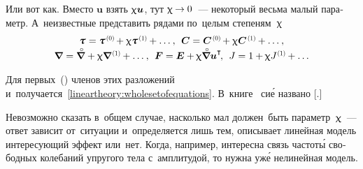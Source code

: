 \begin{otherlanguage}{russian}
Или вот как. Вместо $\bm{u}$ взять $\upchi \bm{u}$, тут ${\upchi \hspace{-0.1ex}\to 0}$~--- некоторый весьма малый параметр. А~неизвестные представить рядами по~целым степеням~$\upchi$
\vspace{.1em}\[\begin{array}{c}
\mathboldtau \hspace{.1ex} = \mathboldtau^{\hspace{0.2ex}\scalebox{0.66}[0.66]{(0)}} \hspace{-0.2ex} + \smallparameter \mathboldtau^{\hspace{0.2ex}\scalebox{0.66}[0.66]{(1)}} \hspace{-0.1ex} + \ldots \hspace{0.1ex}, \:\:
\bm{C} = \bm{C}^{\hspace{0.2ex}\scalebox{0.66}[0.66]{(0)}} \hspace{-0.2ex} + \smallparameter \bm{C}^{\hspace{0.2ex}\scalebox{0.66}[0.66]{(1)}} \hspace{-0.1ex} + \ldots \hspace{0.1ex}, \\[0.1em]
\boldnabla \hspace{0.1ex} = \boldnablacircled \hspace{0.1ex} + \smallparameter \boldnabla^{\hspace{0.2ex}\scalebox{0.66}[0.66]{(1)}} \hspace{-0.1ex} + \ldots \hspace{0.1ex} , \:\:
\bm{F} = \bm{E} + \hspace{-0.1ex} \smallparameter \boldnablacircled {\bm{u}}^{\T} \hspace{-0.3ex}, \:\:
J = 1 + \hspace{-0.1ex} \smallparameter J^{\hspace{0.1ex}\scalebox{0.66}[0.66]{(1)}} \hspace{-0.1ex} + \ldots
\end{array}\]

\noindent Для первых~() членов этих разложений и~получается~\eqref{lineartheory:wholesetofequations}. В~\hbox{книге~\cite{truesdell-firstcourse}} си\'{е} названо [.]

Невозможно сказать в~общем случае, насколько мал должен~быть параметр~$\upchi$~--- ответ зависит от~ситуации и~определяется лишь тем, описывает линейная модель интересующий эффект или~нет. Когда, например, интересна связь частот\'{ы} свободных колебаний упругого тела с~амплитудой, то нужна уж\'{е} нелинейная модель.


\end{otherlanguage}
